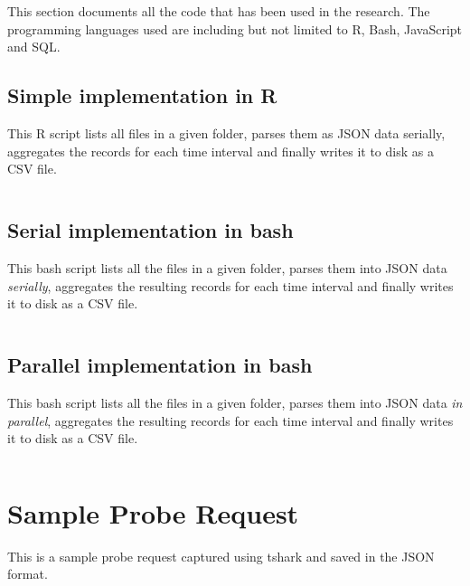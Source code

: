 This section documents all the code that has been used in the research.
The programming languages used are including but not limited to R, Bash, JavaScript and SQL.

\subsection{Simple implementation in R}
This R script lists all files in a given folder, parses them as JSON data serially, aggregates the records for each time interval and finally writes it to disk as a CSV file.
\vspace{1em}
\inputminted{R}{analysis/data-toolkit/old-toolkit.r}

\subsection{Serial implementation in bash}
This bash script lists all the files in a given folder, parses them into JSON data \textit{serially}, aggregates the resulting records for each time interval and finally writes it to disk as a CSV file.
\vspace{1em}
\inputminted{bash}{analysis/data-toolkit/new-toolkit.sh}

\subsection{Parallel implementation in bash}

This bash script lists all the files in a given folder, parses them into JSON data \textit{in parallel}, aggregates the resulting records for each time interval and finally writes it to disk as a CSV file.
\vspace{1em}
\inputminted{bash}{analysis/data-toolkit/new-toolkit-parallel.sh}
\pagebreak

\section{Sample Probe Request} \label{appendix:sampleprobe}
This is a sample probe request captured using tshark and saved in the JSON format.

